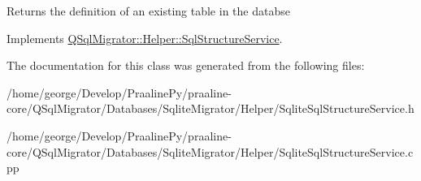 \begin{DoxyReturn}{Returns}
the definition of an existing table in the databse 
\end{DoxyReturn}


Implements \hyperlink{class_q_sql_migrator_1_1_helper_1_1_sql_structure_service_abb2f11402700c1a1e52d596431255e8a}{Q\+Sql\+Migrator\+::\+Helper\+::\+Sql\+Structure\+Service}.



The documentation for this class was generated from the following files\+:\begin{DoxyCompactItemize}
\item 
/home/george/\+Develop/\+Praaline\+Py/praaline-\/core/\+Q\+Sql\+Migrator/\+Databases/\+Sqlite\+Migrator/\+Helper/Sqlite\+Sql\+Structure\+Service.\+h\item 
/home/george/\+Develop/\+Praaline\+Py/praaline-\/core/\+Q\+Sql\+Migrator/\+Databases/\+Sqlite\+Migrator/\+Helper/Sqlite\+Sql\+Structure\+Service.\+cpp\end{DoxyCompactItemize}

